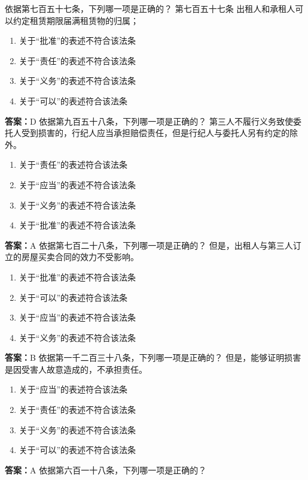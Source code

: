 \documentclass[12pt]{ctexart}
\begin{document}
\begin{questions}
\question 依据第七百五十七条，下列哪一项是正确的？
第七百五十七条 出租人和承租人可以约定租赁期限届满租赁物的归属；
\begin{enumerate}[label=\Alph*.]
\item 关于“批准”的表述不符合该法条
\item 关于“责任”的表述不符合该法条
\item 关于“义务”的表述不符合该法条
\item 关于“可以”的表述符合该法条
\end{enumerate}
\ifprintanswers\par\textbf{答案：}D\fi
\question 依据第九百五十八条，下列哪一项是正确的？
第三人不履行义务致使委托人受到损害的，行纪人应当承担赔偿责任，但是行纪人与委托人另有约定的除外。
\begin{enumerate}[label=\Alph*.]
\item 关于“责任”的表述符合该法条
\item 关于“应当”的表述不符合该法条
\item 关于“义务”的表述不符合该法条
\item 关于“批准”的表述不符合该法条
\end{enumerate}
\ifprintanswers\par\textbf{答案：}A\fi
\question 依据第七百二十八条，下列哪一项是正确的？
但是，出租人与第三人订立的房屋买卖合同的效力不受影响。
\begin{enumerate}[label=\Alph*.]
\item 关于“批准”的表述不符合该法条
\item 关于“可以”的表述符合该法条
\item 关于“应当”的表述不符合该法条
\item 关于“义务”的表述不符合该法条
\end{enumerate}
\ifprintanswers\par\textbf{答案：}B\fi
\question 依据第一千二百三十八条，下列哪一项是正确的？
但是，能够证明损害是因受害人故意造成的，不承担责任。
\begin{enumerate}[label=\Alph*.]
\item 关于“应当”的表述符合该法条
\item 关于“责任”的表述不符合该法条
\item 关于“义务”的表述不符合该法条
\item 关于“可以”的表述不符合该法条
\end{enumerate}
\ifprintanswers\par\textbf{答案：}A\fi
\question 依据第六百一十八条，下列哪一项是正确的？

\end{questions}
\end{document}
